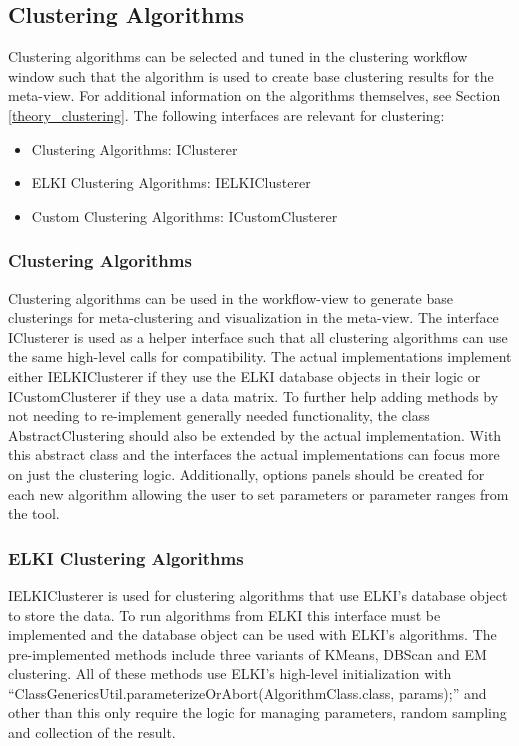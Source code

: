 \documentclass[
	a4paper,
	english,
	twoside,
	openright,               
	11pt                            
	]{report}
\begin{document}
\subsection{Clustering Algorithms}
Clustering algorithms can be selected and tuned in the clustering workflow window such that the algorithm is used to create base clustering results for the meta-view. For additional information on the algorithms themselves, see Section \ref{theory_clustering}. The following interfaces are relevant for clustering:

\begin{itemize}
  \item Clustering Algorithms: IClusterer
  \item ELKI Clustering Algorithms: IELKIClusterer
  \item Custom Clustering Algorithms: ICustomClusterer
\end{itemize}

\subsubsection{Clustering Algorithms}
Clustering algorithms can be used in the workflow-view to generate base clusterings for meta-clustering and visualization in the meta-view. The interface IClusterer is used as a helper interface such that all clustering algorithms can use the same high-level calls for compatibility. The actual implementations implement either IELKIClusterer if they use the ELKI database objects in their logic or ICustomClusterer if they use a data matrix. To further help adding methods by not needing to re-implement generally needed functionality, the class AbstractClustering should also be extended by the actual implementation. With this abstract class and the interfaces the actual implementations can focus more on just the clustering logic. Additionally, options panels should be created for each new algorithm allowing the user to set parameters or parameter ranges from the tool.

\subsubsection{ELKI Clustering Algorithms}
IELKIClusterer is used for clustering algorithms that use ELKI's database object to store the data. To run algorithms from ELKI this interface must be implemented and the database object can be used with ELKI's algorithms. The pre-implemented methods include three variants of KMeans, DBScan and EM clustering. All of these methods use ELKI's high-level initialization with ``ClassGenericsUtil.parameterizeOrAbort(AlgorithmClass.class, params);'' and other than this only require the logic for managing parameters, random sampling and collection of the result.
\end{document}
